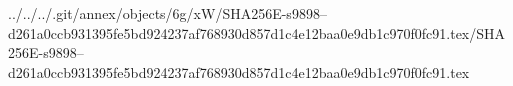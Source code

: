 ../../../.git/annex/objects/6g/xW/SHA256E-s9898--d261a0ccb931395fe5bd924237af768930d857d1c4e12baa0e9db1c970f0fc91.tex/SHA256E-s9898--d261a0ccb931395fe5bd924237af768930d857d1c4e12baa0e9db1c970f0fc91.tex
